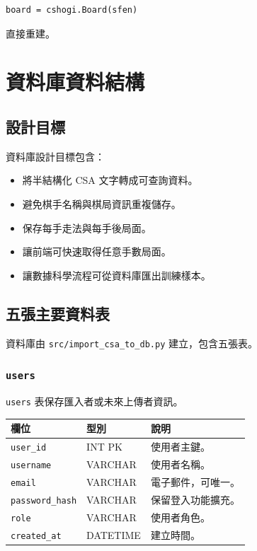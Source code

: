 \documentclass[12pt,a4paper,fontset=none]{ctexart}
\begin{document}
\begin{lstlisting}[style=cmd]
board = cshogi.Board(sfen)
\end{lstlisting}

直接重建。

\section{資料庫資料結構}

\subsection{設計目標}

資料庫設計目標包含：

\begin{itemize}
  \item 將半結構化 CSA 文字轉成可查詢資料。
  \item 避免棋手名稱與棋局資訊重複儲存。
  \item 保存每手走法與每手後局面。
  \item 讓前端可快速取得任意手數局面。
  \item 讓數據科學流程可從資料庫匯出訓練樣本。
\end{itemize}

\subsection{五張主要資料表}

資料庫由 \texttt{src/import\_csa\_to\_db.py} 建立，包含五張表。

\subsubsection{\texttt{users}}

\texttt{users} 表保存匯入者或未來上傳者資訊。

\begin{longtable}{p{}p{}p{}}
\toprule
\textbf{欄位} & \textbf{型別} & \textbf{說明}\\
\midrule
\endhead
\texttt{user\_id} & INT PK & 使用者主鍵。\\
\texttt{username} & VARCHAR & 使用者名稱。\\
\texttt{email} & VARCHAR & 電子郵件，可唯一。\\
\texttt{password\_hash} & VARCHAR & 保留登入功能擴充。\\
\texttt{role} & VARCHAR & 使用者角色。\\
\texttt{created\_at} & DATETIME & 建立時間。\\
\bottomrule
\end{longtable}
\end{document}
